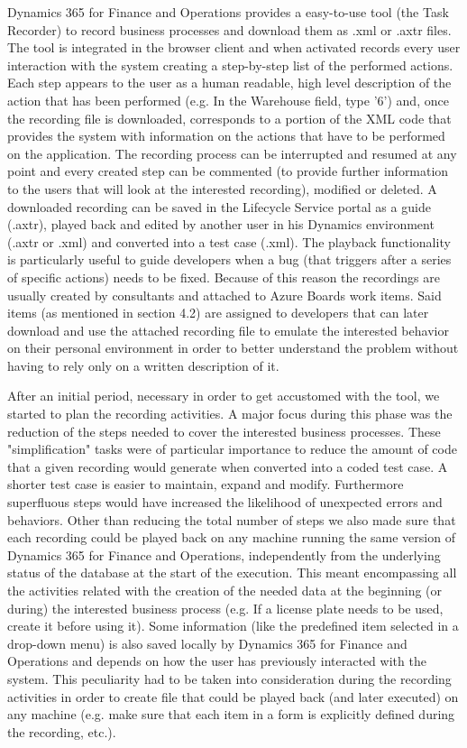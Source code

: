 Dynamics 365 for Finance and Operations provides a easy-to-use tool (the Task Recorder) to record business processes and download them as .xml or .axtr files. The tool is integrated in the browser client and when activated records every user interaction with the system creating a step-by-step list of the performed actions. Each step appears to the user as a human readable, high level description of the action that has been performed (e.g. In the Warehouse field, type '6') and, once the recording file is downloaded, corresponds to a portion of the XML code that provides the system with information on the actions that have to be performed on the application. The recording process can be interrupted and resumed at any point and every created step can be commented (to provide further information to the users that will look at the interested recording), modified or deleted. A downloaded recording can be saved in the Lifecycle Service portal as a guide (.axtr), played back and edited by another user in his Dynamics environment (.axtr or .xml) and converted into a test case (.xml). The playback functionality is particularly useful to guide developers when a bug (that triggers after a series of specific actions) needs to be fixed. Because of this reason the recordings are usually created by consultants and attached to Azure Boards work items. Said items (as mentioned in section 4.2) are assigned to developers that can later download and use the attached recording file to emulate the interested behavior on their personal environment in order to better understand the problem without having to rely only on a written description of it.

After an initial period, necessary in order to get accustomed with the tool, we started to plan the recording activities. A major focus during this phase was the reduction of the steps needed to cover the interested business processes. These "simplification" tasks were of particular importance to reduce the amount of code that a given recording would generate when converted into a coded test case. A shorter test case is easier to maintain, expand and modify. Furthermore superfluous steps would have increased the likelihood of unexpected errors and behaviors. Other than reducing the total number of steps we also made sure that each recording could be played back on any machine running the same version of Dynamics 365 for Finance and Operations, independently from the underlying status of the database at the start of the execution. This meant encompassing all the activities related with the creation of the needed data at the beginning (or during) the interested business process (e.g. If a license plate needs to be used, create it before using it). Some information (like the predefined item selected in a drop-down menu) is also saved locally by Dynamics 365 for Finance and Operations and depends on how the user has previously interacted with the system. This peculiarity had to be taken into consideration during the recording activities in order to create file that could be played back (and later executed) on any machine (e.g. make sure that each item in a form is explicitly defined during the recording, etc.). 

